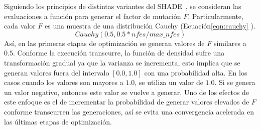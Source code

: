 Siguiendo los principios de distintas variantes del SHADE~\cite{awad2016ensemble, brest2016shade}, se consideran las evaluaciones a función para generar el factor de mutación $F$.
%
Particularmente, cada valor $F$ es una muestra de una distribución Cauchy (Ecuación\ref{eqn:cauchy} ).
\begin{equation}\label{eqn:cauchy}
 Cauchy(0.5, 0.5*nfes/max\_nfes)
\end{equation}
%
Así, en las primeras etapas de optimización se generan valores de $F$ similares a $0.5$.
%
Conforme la execución transcurre, la función de densidad sufre una transformación gradual ya que la varianza se incrementa, esto implica que se generan valores fuera del intervalo $[0.0, 1.0]$ con una probabilidad alta.
%
En los casos cuando los valores son mayores a $1.0$, se utiliza un valor de $1.0$.
%
Si se genera un valor negativo, entonces este valor se vuelve a generar.
%
Uno de los efectos de este enfoque es el de incrementar la probabilidad de generar valores elevados de $F$ conforme transcurren las generaciones, así se evita una convergencia acelerada en las últimas etapas de optimización.



